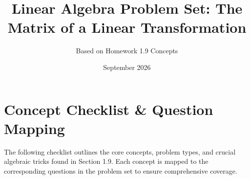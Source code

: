 \documentclass[12pt]{article}
\title{Linear Algebra Problem Set: The Matrix of a Linear Transformation}
\author{Based on Homework 1.9 Concepts}
\date{September 2026}
\begin{document}
\maketitle


\tableofcontents
\clearpage

\section{Concept Checklist \& Question Mapping}
\label{sec:checklist_start}
The following checklist outlines the core concepts, problem types, and crucial algebraic tricks found in Section 1.9. Each concept is mapped to the corresponding questions in the problem set to ensure comprehensive coverage.
\end{document}
